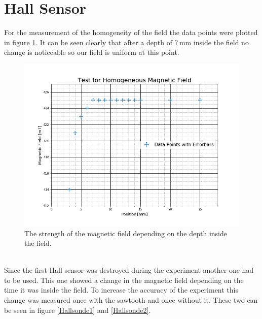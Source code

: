 \section{Hall Sensor}
For the measurement of the homogeneity of the field the data points were plotted in figure \ref{Homogen}. It can be seen clearly that after a depth of $7$\,mm inside the field no change is noticeable so our field is uniform at this point.
\begin{figure}[ht]
	\includegraphics[scale=0.5]{Bild/Hallsonde}
	\centering
	\caption[Uniformity of the Magnetic Field]{The strength of the magnetic field depending on the depth inside the field.}
	\label{Homogen}
\end{figure}\\
Since the first Hall sensor was destroyed during the experiment another one had to be used. This one showed a change in the magnetic field depending on the time it was inside the field. To increase the accuracy of the experiment this change was measured once with the sawtooth and once without it. These two can be seen in figure \ref{Hallsonde1} and \ref{Hallsonde2}.
